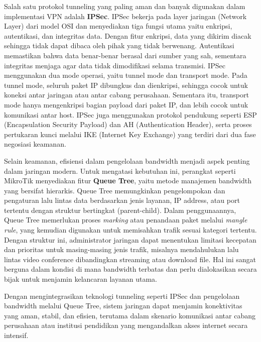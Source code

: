 Salah satu protokol tunneling yang paling aman dan banyak digunakan dalam implementasi VPN adalah \textbf{IPSec}. IPSec bekerja pada layer jaringan (Network Layer) dari model OSI dan menyediakan tiga fungsi utama yaitu enkripsi, autentikasi, dan integritas data. Dengan fitur enkripsi, data yang dikirim diacak sehingga tidak dapat dibaca oleh pihak yang tidak berwenang. Autentikasi memastikan bahwa data benar-benar berasal dari sumber yang sah, sementara integritas menjaga agar data tidak dimodifikasi selama transmisi. IPSec menggunakan dua mode operasi, yaitu tunnel mode dan transport mode. Pada tunnel mode, seluruh paket IP dibungkus dan dienkripsi, sehingga cocok untuk koneksi antar jaringan atau antar cabang perusahaan. Sementara itu, transport mode hanya mengenkripsi bagian payload dari paket IP, dan lebih cocok untuk komunikasi antar host. IPSec juga menggunakan protokol pendukung seperti ESP (Encapsulation Security Payload) dan AH (Authentication Header), serta proses pertukaran kunci melalui IKE (Internet Key Exchange) yang terdiri dari dua fase negosiasi keamanan.

Selain keamanan, efisiensi dalam pengelolaan bandwidth menjadi aspek penting dalam jaringan modern. Untuk mengatasi kebutuhan ini, perangkat seperti MikroTik menyediakan fitur \textbf{Queue Tree}, yaitu metode manajemen bandwidth yang bersifat hierarkis. Queue Tree memungkinkan pengelompokan dan pengaturan lalu lintas data berdasarkan jenis layanan, IP address, atau port tertentu dengan struktur bertingkat (parent-child). Dalam penggunaannya, Queue Tree memerlukan proses \textit{marking} atau penandaan paket melalui \textit{mangle rule}, yang kemudian digunakan untuk memisahkan trafik sesuai kategori tertentu. Dengan struktur ini, administrator jaringan dapat menentukan limitasi kecepatan dan prioritas untuk masing-masing jenis trafik, misalnya mendahulukan lalu lintas video conference dibandingkan streaming atau download file. Hal ini sangat berguna dalam kondisi di mana bandwidth terbatas dan perlu dialokasikan secara bijak untuk menjamin kelancaran layanan utama.

Dengan mengintegrasikan teknologi tunneling seperti IPSec dan pengelolaan bandwidth melalui Queue Tree, sistem jaringan dapat menjamin konektivitas yang aman, stabil, dan efisien, terutama dalam skenario komunikasi antar cabang perusahaan atau institusi pendidikan yang mengandalkan akses internet secara intensif.

